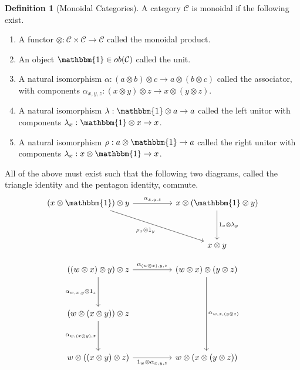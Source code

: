 \documentclass{article}
\theoremstyle{definition}
\newtheorem{definition}{Definition}
\begin{document}
\begin{definition}[Monoidal Categories]
    A category $\mathcal{C}$ is monoidal if the following exist.
    \begin{enumerate}
        \item A functor $\otimes:\mathcal{C}\times\mathcal{C}\rightarrow\mathcal{C}$ called the monoidal product.
        \item An object $\mathbbm{1}\in ob(\mathcal{C})$ called the unit.
        \item A natural isomorphism $\alpha : (a\otimes b)\otimes c\rightarrow a\otimes (b\otimes c)$ called the associator, with components $\alpha_{x,y,z}: (x\otimes y)\otimes z\rightarrow x\otimes (y\otimes z)$.
        \item A natural isomorphism $\lambda : \mathbbm{1}\otimes a\rightarrow a$ called the left unitor with components $\lambda_x : \mathbbm{1}\otimes x\rightarrow x$.
        \item A natural isomorphism $\rho : a\otimes \mathbbm{1}\rightarrow a$ called the right unitor with components $\lambda_x : x\otimes \mathbbm{1}\rightarrow x$.
    \end{enumerate}
    All of the above must exist such that the following two diagrams, called the triangle identity and the pentagon identity, commute.
    \[\begin{tikzcd}
            {(x\otimes\mathbbm{1})\otimes y} && {x\otimes(\mathbbm{1}\otimes y)} \\
            \\
            && {x\otimes y}
            \arrow["{{\rho_x\otimes 1_y}}"', from=1-1, to=3-3]
            \arrow["{{1_x\otimes\lambda_y}}", from=1-3, to=3-3]
            \arrow["{{\alpha_{x,y,z}}}", from=1-1, to=1-3]
        \end{tikzcd}\]

    \[\begin{tikzcd}
            {((w\otimes x)\otimes y)\otimes z} && {(w\otimes x)\otimes(y\otimes z)} \\
            \\
            {(w\otimes (x\otimes y))\otimes z} \\
            \\
            {w\otimes ((x\otimes y)\otimes z)} && {w\otimes (x\otimes (y\otimes z))}
            \arrow["{{\alpha_{w,x,(y\otimes z)}}}", from=1-3, to=5-3]
            \arrow["{{\alpha_{(w\otimes x),y,z}}}", from=1-1, to=1-3]
            \arrow["{{\alpha_{w,x,y}\otimes 1_z}}"', from=1-1, to=3-1]
            \arrow["{{\alpha_{w,(x\otimes y),z}}}"', from=3-1, to=5-1]
            \arrow["{{1_w\otimes \alpha_{x,y,z}}}"', from=5-1, to=5-3]
        \end{tikzcd}\]
\end{definition}
\end{document}
